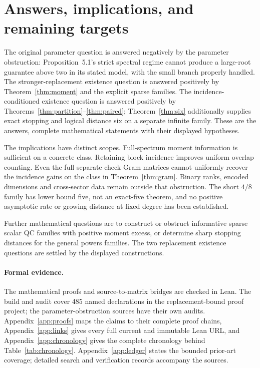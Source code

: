 \documentclass[11pt]{article}
\begin{document}
\section{Answers, implications, and remaining targets}
\label{sec:answers}
The original parameter question is answered negatively by the parameter
obstruction: Proposition~5.1's strict spectral regime cannot produce a large-root
guarantee above two in its stated model, with the small branch properly handled.
The stronger-replacement existence question is answered positively by
Theorem~\ref{thm:moment} and the explicit sparse families. The
incidence-conditioned existence question is answered positively by
Theorems~\ref{thm:partition}--\ref{thm:paired}; Theorem~\ref{thm:six}
additionally supplies exact stopping and logical distance six on a separate
infinite family. These are the answers, complete mathematical statements with their displayed hypotheses.

The implications have distinct scopes. Full-spectrum moment information is
sufficient on a concrete class. Retaining block incidence improves uniform
overlap counting. Even the full separate check Gram matrices cannot uniformly
recover the incidence gains on the class in Theorem~\ref{thm:gram}.
Binary ranks, encoded dimensions and cross-sector data remain outside that
obstruction. The short $4/8$ family has lower bound five, not an exact-five
theorem, and no positive asymptotic rate or growing distance at fixed degree
has been established.

Further mathematical questions are to construct or obstruct informative sparse scalar
QC families with positive moment excess, or determine sharp stopping distances
for the general powers families. The two replacement existence questions are
settled by the displayed constructions.

\paragraph{Formal evidence.}
The mathematical proofs and source-to-matrix bridges are checked in Lean.
The build and audit cover 485 named declarations in the replacement-bound
proof project; the parameter-obstruction sources have their own audits.
Appendix~\ref{app:proofs} maps the claims to their complete proof chains,
Appendix~\ref{app:links} gives every full current and immutable Lean URL, and
Appendix~\ref{app:chronology} gives the complete chronology behind
Table~\ref{tab:chronology}. Appendix~\ref{app:ledger} states the bounded
prior-art coverage; detailed search and verification records accompany the sources.
\end{document}
